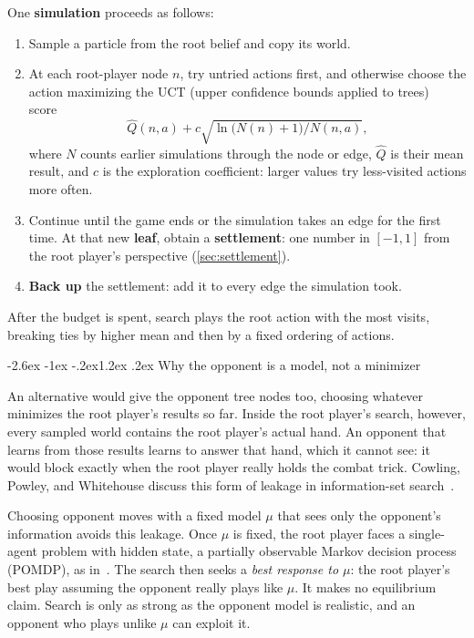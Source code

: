 \documentclass[11pt,a4paper]{article}
\makeatletter
\renewcommand\subsection{\@startsection{subsection}{2}{\z@}
  {-2.6ex \@plus -1ex \@minus -.2ex}{1.2ex \@plus .2ex}
  {\normalfont\large\sffamily\bfseries\color{ink}}}
\theoremstyle{plain}
\theoremstyle{definition}
\newcommand{\term}[1]{\textbf{#1}}
\makeatother
\begin{document}
One \term{simulation} proceeds as follows:
\begin{enumerate}
\item Sample a particle from the root belief and copy its world.
\item At each root-player node $n$, try untried actions first, and otherwise
  choose the action maximizing the UCT (upper confidence bounds applied to
  trees) score~\cite{kocsis2006}
  \[
  \widehat Q(n,a)+c\sqrt{\ln\bigl(N(n)+1\bigr)/N(n,a)},
  \]
  where $N$ counts earlier simulations through the node or edge,
  $\widehat Q$ is their mean result, and $c$ is the exploration coefficient:
  larger values try less-visited actions more often.
\item Continue until the game ends or the simulation takes an edge for the
  first time. At that new \term{leaf}, obtain a \term{settlement}: one number
  in $[-1,1]$ from the root player's perspective (\cref{sec:settlement}).
\item \term{Back up} the settlement: add it to every edge the simulation
  took.
\end{enumerate}
After the budget is spent, search plays the root action with the most visits,
breaking ties by higher mean and then by a fixed ordering of actions.

\subsection{Why the opponent is a model, not a minimizer}
\label{sec:opponent}

An alternative would give the opponent tree nodes too, choosing whatever
minimizes the root player's results so far. Inside the root player's search,
however, every sampled world contains the root player's actual hand. An
opponent that learns from those results learns to answer that hand, which it
cannot see: it would block exactly when the root player really holds the
combat trick. Cowling, Powley, and Whitehouse discuss this form of leakage
in information-set search~\cite[Section~X]{cowling2012}.

Choosing opponent moves with a fixed model $\mu$ that sees only the
opponent's information avoids this leakage. Once $\mu$ is fixed, the root
player faces a single-agent problem with hidden state, a partially observable
Markov decision process (POMDP), as in~\cite{silver2010}. The search then seeks a \emph{best
response to $\mu$}: the root player's best play assuming the opponent
really plays like $\mu$. It makes no equilibrium claim. Search is only as
strong as the opponent model is realistic, and an opponent who plays unlike
$\mu$ can exploit it.
\end{document}
